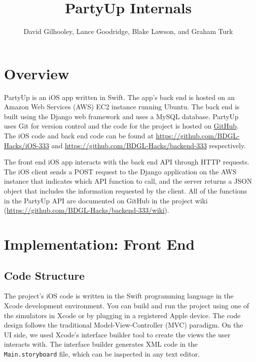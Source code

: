 \documentclass[12pt]{article}
\title{PartyUp Internals}
\author{David Gilhooley, Lance Goodridge, Blake Lawson, and Graham Turk}
\begin{document}
\pagestyle{plain}

\maketitle


\section{Overview}

PartyUp is an iOS app written in Swift.
The app's back end is hosted on an Amazon Web Services (AWS)
EC2 instance running Ubuntu.
The back end is built using the Django web framework and uses
a MySQL database.
PartyUp uses Git for version control and the code for the project is 
hosted on \href{https://github.com/}{GitHub}.
The iOS code and back end code can be found at 
\url{https://github.com/BDGL-Hacks/iOS-333} and
\url{https://github.com/BDGL-Hacks/backend-333} respectively.

The front end iOS app interacts with the back end API through HTTP requests.
The iOS client sends a POST request to the Django application on the AWS instance
that indicates which API function to call, and the server returns a JSON object that 
includes the information requested by the client.
All of the functions in the PartyUp API are documented on GitHub
in the project wiki (\url{https://github.com/BDGL-Hacks/backend-333/wiki}).


\section{Implementation: Front End}

\subsection{Code Structure}
The project's iOS code is written in the Swift programming language in the Xcode development environment.
You can build and run the project using one of the simulators in Xcode or
by plugging in a registered Apple device.
The code design follows the traditional Model-View-Controller (MVC) paradigm.
On the UI side, we used Xcode's interface builder tool to
create the views the user interacts with.
The interface builder generates XML code in the \texttt{Main.storyboard} file,
which can be inspected in any text editor.
\end{document}
